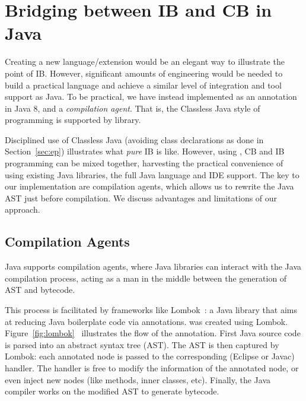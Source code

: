 \section{Bridging between IB and CB in Java}\label{sec:imp}


Creating a new language/extension would be an
elegant way to illustrate the point of IB. However,
significant amounts of engineering would be needed to build a practical
language and achieve a similar level of integration and tool support
as Java. To be practical, %
we have instead implemented
\mixin as an annotation in Java 8, and a \emph{compilation agent}.
That is, the Classless Java style of programming
is supported by library.

Disciplined use of Classless Java (avoiding class
declarations as done in Section~\ref{sec:ep}) illustrates what \emph{pure} IB is like.
However, using \mixin, CB and IB programming can be mixed together,
harvesting the practical convenience of using existing Java libraries, the full
Java language and IDE support.
The key to our implementation are compilation agents, which
 allows us to rewrite the Java AST just
before compilation. We discuss advantages and limitations of our approach.

\subsection{Compilation Agents}
Java supports compilation agents, where Java libraries can interact with the Java compilation process,
acting as a man in the middle between the
generation of AST and bytecode.

This process is facilitated by frameworks like Lombok~\cite{lombok}:
a Java library that aims at reducing Java boilerplate code via 
annotations. \mixin was created using Lombok.
Figure~\ref{fig:lombok}~\cite{neildo2011blog} illustrates the flow of
the \mixin annotation.
First Java source code is parsed into an abstract syntax tree (AST).
The AST is then captured by Lombok:
each annotated node is passed to
the corresponding (Eclipse or Javac) handler. The handler is
free to modify the information of the annotated node, or even inject new nodes (like methods, inner classes,
etc). Finally, the Java compiler works on the modified AST to generate bytecode.


